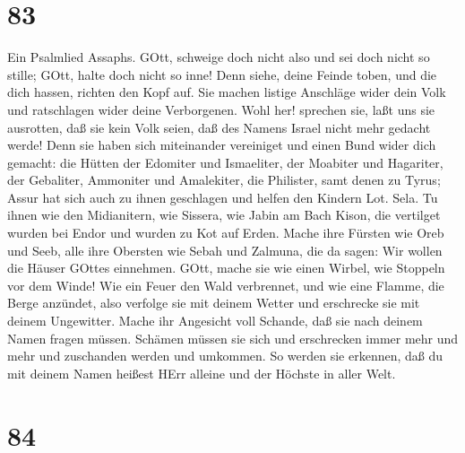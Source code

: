 \hypertarget{section-82}{%
\section{83}\label{section-82}}

 Ein Psalmlied Assaphs.  GOtt, schweige doch
nicht also und sei doch nicht so stille; GOtt, halte doch nicht so inne!
 Denn siehe, deine Feinde toben, und die dich hassen,
richten den Kopf auf.  Sie machen listige Anschläge wider
dein Volk und ratschlagen wider deine Verborgenen.  Wohl
her! sprechen sie, laßt uns sie ausrotten, daß sie kein Volk seien, daß
des Namens Israel nicht mehr gedacht werde!  Denn sie haben
sich miteinander vereiniget und einen Bund wider dich gemacht:
 die Hütten der Edomiter und Ismaeliter, der Moabiter und
Hagariter,  der Gebaliter, Ammoniter und Amalekiter, die
Philister, samt denen zu Tyrus;  Assur hat sich auch zu
ihnen geschlagen und helfen den Kindern Lot. Sela.  Tu
ihnen wie den Midianitern, wie Sissera, wie Jabin am Bach Kison,
 die vertilget wurden bei Endor und wurden zu Kot auf
Erden.  Mache ihre Fürsten wie Oreb und Seeb, alle ihre
Obersten wie Sebah und Zalmuna,  die da sagen: Wir wollen
die Häuser GOttes einnehmen.  GOtt, mache sie wie einen
Wirbel, wie Stoppeln vor dem Winde!  Wie ein Feuer den Wald
verbrennet, und wie eine Flamme, die Berge anzündet,  also
verfolge sie mit deinem Wetter und erschrecke sie mit deinem Ungewitter.
 Mache ihr Angesicht voll Schande, daß sie nach deinem
Namen fragen müssen.  Schämen müssen sie sich und
erschrecken immer mehr und mehr und zuschanden werden und umkommen.
 So werden sie erkennen, daß du mit deinem Namen heißest
HErr alleine und der Höchste in aller Welt.

\hypertarget{section-83}{%
\section{84}\label{section-83}}

